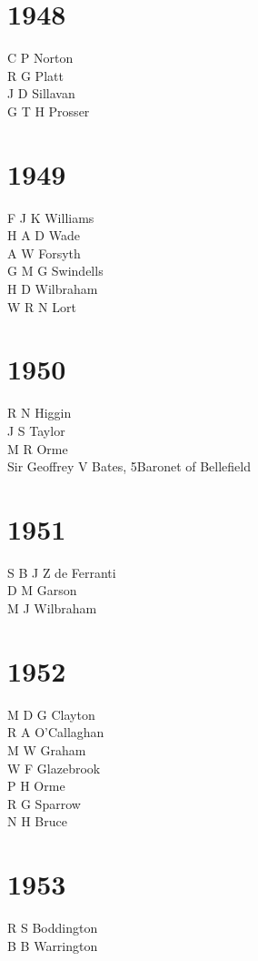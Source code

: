 \begin{multicols}{2}
  \section*{1948}
  C P Norton \\
  R G Platt \\
  J D Sillavan \\
  G T H Prosser \\
  \section*{1949}
  F J K Williams \\
  H A D Wade \\
  A W Forsyth \\
  G M G Swindells \\
  H D Wilbraham \\
  W R N Lort \\
  \section*{1950}
  R N Higgin \\
  J S Taylor \\
  M R Orme \\
  Sir Geoffrey V Bates, 5\nth Baronet of Bellefield \\
  \section*{1951}
  S B J Z de Ferranti \\
  D M Garson \\
  M J Wilbraham \\
  \section*{1952}
  M D G Clayton \\
  R A O'Callaghan \\
  M W Graham \\
  W F Glazebrook \\
  P H Orme \\
  R G Sparrow \\
  N H Bruce \\
  \section*{1953}
  R S Boddington \\
  B B Warrington \\

\end{multicols}
